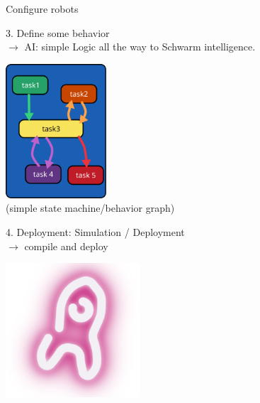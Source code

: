 \documentclass[aspectratio=169]{beamer}
\begin{document}
\begin{frame}{Configure robots}
    \begin{minipage}{0.45\textwidth}
    \begin{block}{}
        3. Define some behavior\\
        \tiny $\rightarrow$ AI: simple Logic all the way to Schwarm intelligence.
    \end{block}
        \includegraphics[height=5cm]{figures/planning_graph.pdf}\\
        \tiny
        (simple state machine/behavior graph)
    \end{minipage}\begin{minipage}{0.06\textwidth}
        \hspace{.1cm}
    \end{minipage}\begin{minipage}{0.45\textwidth}
    \begin{block}{}
        4. Deployment: Simulation / Deployment\\
        \tiny $\rightarrow$ compile and deploy
    \end{block}
        \includegraphics[height=5cm]{figures/launch.pdf}
    \end{minipage}
\end{frame}

\end{document}
